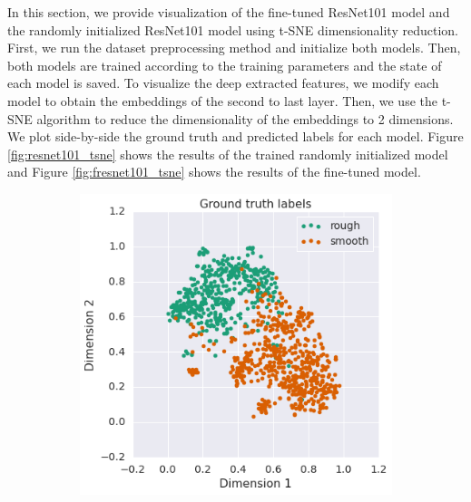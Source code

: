 \documentclass{aci}
\numberwithin{equation}{section}
\begin{document}
In this section, we provide visualization of the fine-tuned ResNet101 model and
the randomly initialized ResNet101 model using t-SNE dimensionality reduction.
First, we run the dataset preprocessing method and initialize both models. Then,
both models are trained according to the training parameters and the state of
each model is saved. To visualize the deep extracted features, we modify each
model to obtain the embeddings of the second to last layer. Then, we use the
t-SNE algorithm to reduce the dimensionality of the embeddings to 2 dimensions.
We plot side-by-side the ground truth and predicted labels for each model.
Figure \ref{fig:resnet101_tsne} shows the results of the trained randomly
initialized model and Figure \ref{fig:fresnet101_tsne} shows the results of the
fine-tuned model.

\begin{figure}[h]
    \centering
    \begin{subfigure}{.45\textwidth}
        \includegraphics[width=1\linewidth]{thesis_assets/plots/fresnet101_gt_tsne.png}
    \end{subfigure}
    \begin{subfigure}{.45\textwidth}

\end{subfigure}
\end{figure}
\end{document}
